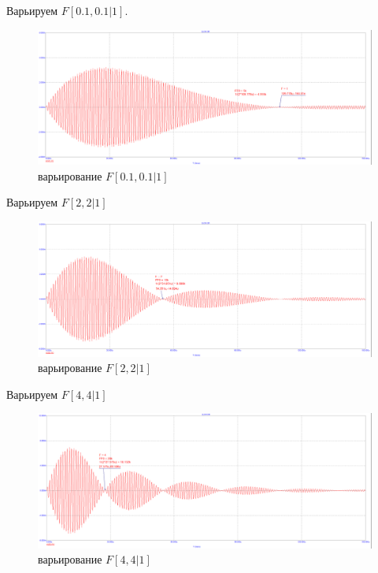 \documentclass[a4paper, 14pt]{extarticle}%
\begin{document}
Варьируем $F [0.1, 0.1|1]$. 

\begin{figure}[h!]
	\centering
			\includegraphics[width=1.1\linewidth]{908_work/10_3_f1.png}
            \caption{варьирование $F [0.1, 0.1|1]$}
	\label{A}
\end{figure}


Варьируем $F [2, 2|1]$

\begin{figure}[h!]
	\centering
			\includegraphics[width=1.1\linewidth]{908_work/10_3_f2.png}
            \caption{варьирование $F [2, 2|1]$}
	\label{A}
\end{figure}

Варьируем  $F  [4, 4|1]$

\begin{figure}[h!]
	\centering
			\includegraphics[width=1.1\linewidth]{908_work/10_3_f4.png}
            \caption{варьирование $F  [4, 4|1]$}
	\label{A}
\end{figure}
\end{document}
